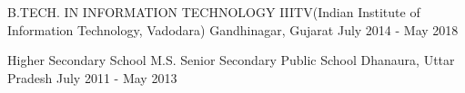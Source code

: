\begin{cventries}
  \cventry
    {B.TECH. IN INFORMATION TECHNOLOGY}
    {IIITV(Indian Institute of Information Technology, Vadodara)}
    {Gandhinagar, Gujarat}
    {July 2014 - May 2018}
    {}
    {}
\end{cventries}

\begin{cventries}
  \cventry
    {Higher Secondary School}
    {M.S. Senior Secondary Public School}
    {Dhanaura, Uttar Pradesh}
    {July 2011 - May 2013}
    {}
    {}
\end{cventries}
